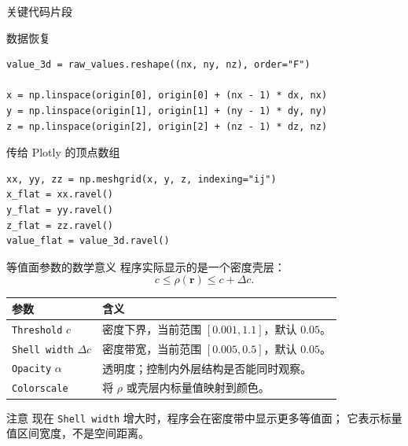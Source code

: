 \documentclass[aspectratio=169,11pt]{ctexbeamer}
\begin{document}
\begin{frame}[fragile]{关键代码片段}
  \begin{block}{数据恢复}
\begin{Verbatim}[fontsize=\scriptsize]
value_3d = raw_values.reshape((nx, ny, nz), order="F")

x = np.linspace(origin[0], origin[0] + (nx - 1) * dx, nx)
y = np.linspace(origin[1], origin[1] + (ny - 1) * dy, ny)
z = np.linspace(origin[2], origin[2] + (nz - 1) * dz, nz)
\end{Verbatim}
  \end{block}

  \begin{block}{传给 Plotly 的顶点数组}
\begin{Verbatim}[fontsize=\scriptsize]
xx, yy, zz = np.meshgrid(x, y, z, indexing="ij")
x_flat = xx.ravel()
y_flat = yy.ravel()
z_flat = zz.ravel()
value_flat = value_3d.ravel()
\end{Verbatim}
  \end{block}
\end{frame}

\begin{frame}{等值面参数的数学意义}
  \small
  程序实际显示的是一个密度壳层：
  \[
    c \le \rho(\mathbf r) \le c+\Delta c .
  \]

  \begin{table}
    \centering
    \begin{tabularx}{0.94\linewidth}{lX}
      \toprule
      参数 & 含义 \\
      \midrule
      \texttt{Threshold} $c$ & 密度下界，当前范围 $[0.001,1.1]$，默认 $0.05$。 \\
      \texttt{Shell width} $\Delta c$ & 密度带宽，当前范围 $[0.005,0.5]$，默认 $0.05$。 \\
      \texttt{Opacity} $\alpha$ & 透明度；控制内外层结构是否能同时观察。 \\
      \texttt{Colorscale} & 将 $\rho$ 或壳层内标量值映射到颜色。 \\
      \bottomrule
    \end{tabularx}
  \end{table}

  \begin{block}{注意}
    现在 \texttt{Shell width} 增大时，程序会在密度带中显示更多等值面；
    它表示标量值区间宽度，不是空间距离。
  \end{block}
\end{frame}
\end{document}
